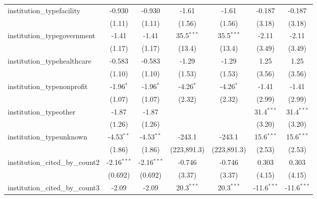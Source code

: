 \begin{tabular}{lcccccc}
   institution\_typefacility             & -0.930        & -0.930        & -1.61         & -1.61         & -0.187        & -0.187\\   
                                         & (1.11)        & (1.11)        & (1.56)        & (1.56)        & (3.18)        & (3.18)\\   
   institution\_typegovernment           & -1.41         & -1.41         & 35.5$^{***}$  & 35.5$^{***}$  & -2.11         & -2.11\\   
                                         & (1.17)        & (1.17)        & (13.4)        & (13.4)        & (3.49)        & (3.49)\\   
   institution\_typehealthcare           & -0.583        & -0.583        & -1.29         & -1.29         & 1.25          & 1.25\\   
                                         & (1.10)        & (1.10)        & (1.53)        & (1.53)        & (3.56)        & (3.56)\\   
   institution\_typenonprofit            & -1.96$^{*}$   & -1.96$^{*}$   & -4.26$^{*}$   & -4.26$^{*}$   & -1.41         & -1.41\\   
                                         & (1.07)        & (1.07)        & (2.32)        & (2.32)        & (2.99)        & (2.99)\\   
   institution\_typeother                & -1.87         & -1.87         &               &               & 31.4$^{***}$  & 31.4$^{***}$\\   
                                         & (1.26)        & (1.26)        &               &               & (3.20)        & (3.20)\\   
   institution\_typeunknown              & -4.53$^{**}$  & -4.53$^{**}$  & -243.1        & -243.1        & 15.6$^{***}$  & 15.6$^{***}$\\   
                                         & (1.86)        & (1.86)        & (223,891.3)   & (223,891.3)   & (2.53)        & (2.53)\\   
   institution\_cited\_by\_count2        & -2.16$^{***}$ & -2.16$^{***}$ & -0.746        & -0.746        & 0.303         & 0.303\\   
                                         & (0.692)       & (0.692)       & (3.37)        & (3.37)        & (4.15)        & (4.15)\\   
   institution\_cited\_by\_count3        & -2.09         & -2.09         & 20.3$^{***}$  & 20.3$^{***}$  & -11.6$^{***}$ & -11.6$^{***}$\\   

\end{tabular}
